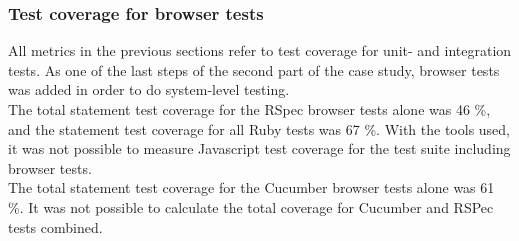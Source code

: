 \subsubsection{Test coverage for browser tests}

All metrics in the previous sections refer to test coverage for unit-
and integration tests. As one of the last steps of the second part of
the case study, browser tests was added in order to do system-level
testing.\\

The total statement test coverage for the RSpec browser tests alone was
46 \%, and the statement test coverage for all Ruby tests was 67 \%.
With the tools used, it was not possible to measure Javascript test
coverage for the test suite including browser tests.\\

The total statement test coverage for the Cucumber browser tests alone
was 61 \%. It was not possible to calculate the total coverage for
Cucumber and RSPec tests combined.\\
